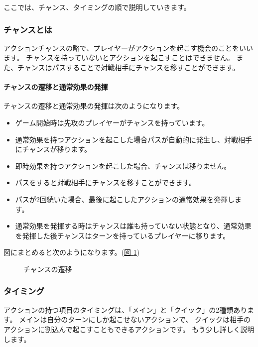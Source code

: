 \documentclass[letterpaper,10pt,dvipdfmx]{sphinxmanual}
\begin{document}
ここでは、チャンス、タイミングの順で説明していきます。


\subsubsection{チャンスとは}
\label{\detokenize{common/03-action:id19}}
アクションチャンスの略で、プレイヤーがアクションを起こす機会のことをいいます。
チャンスを持っていないとアクションを起こすことはできません。
また、チャンスはパスすることで対戦相手にチャンスを移すことができます。


\paragraph{チャンスの遷移と通常効果の発揮}
\label{\detokenize{common/03-action:id20}}
チャンスの遷移と通常効果の発揮は次のようになります。
\begin{itemize}
\item {} 
ゲーム開始時は先攻のプレイヤーがチャンスを持っています。

\item {} 
通常効果を持つアクションを起こした場合パスが自動的に発生し、対戦相手にチャンスが移ります。

\item {} 
即時効果を持つアクションを起こした場合、チャンスは移りません。

\item {} 
パスをすると対戦相手にチャンスを移すことができます。

\item {} 
パスが2回続いた場合、最後に起こしたアクションの通常効果を発揮します。

\item {} 
通常効果を発揮する時はチャンスは誰も持っていない状態となり、通常効果を発揮した後チャンスはターンを持っているプレイヤーに移ります。

\end{itemize}

図にまとめると次のようになります。(\hyperref[\detokenize{common/03-action:chance}]{図 \ref{\detokenize{common/03-action:chance}}})

\begin{figure}[htbp]
\centering
\capstart

\noindent{}
\caption{チャンスの遷移}\label{\detokenize{common/03-action:id35}}\label{\detokenize{common/03-action:chance}}\end{figure}


\subsubsection{タイミング}
\label{\detokenize{common/03-action:id21}}
アクションの持つ項目のタイミングは、「メイン」と「クイック」の2種類あります。
メインは自分のターンにしか起こせないアクションで、
クイックは相手のアクションに割込んで起こすこともできるアクションです。
もう少し詳しく説明します。
\end{document}
